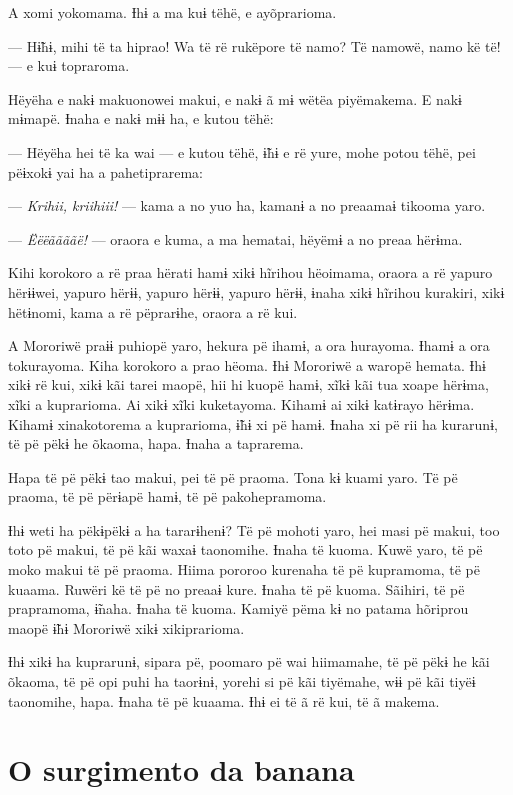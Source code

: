 A xomi yokomama. Ɨhɨ a ma kuɨ tëhë, e ayõprarioma. 

--- Hɨ̃hɨ, mihi të ta hiprao! Wa të rë rukëpore të namo? Të namowë, namo kë
të! --- e kuɨ topraroma. 

Hëyëha e nakɨ makuonowei makui, e nakɨ ã mɨ wëtëa piyëmakema. E nakɨ
mɨmapë. Ɨnaha e nakɨ mɨɨ ha, e kutou tëhë: 

--- Hëyëha hei të ka wai --- e kutou tëhë, ɨ̃hɨ e rë yure, mohe potou tëhë,
pei pëɨxokɨ yai ha a pahetiprarema:

--- \textit{Krihii, kriihiii!} --- kama a no yuo ha, kamanɨ a no preaamaɨ tikooma
yaro. 

--- \textit{Ëëëããããë!} --- oraora e kuma, a ma hematai, hëyëmɨ a no preaa hërɨma. 

Kihi korokoro a rë praa hërati hamɨ xikɨ hĩrihou hëoimama, oraora a rë
yapuro hërɨɨwei, yapuro hërɨɨ, yapuro hërɨɨ, yapuro hërɨɨ, ɨnaha xikɨ
hĩrihou kurakiri, xikɨ hëtɨnomi, kama a rë pëprarɨhe, oraora a rë kui. 

A Mororiwë praɨɨ puhiopë yaro, hekura pë ihamɨ, a ora hurayoma. Ɨhamɨ a
 ora tokurayoma. Kiha korokoro a prao hëoma. Ɨhɨ Mororiwë a waropë
 hemata. Ɨhɨ xikɨ rë kui, xikɨ kãi tarei maopë, hii hi kuopë hamɨ, xĩkɨ
 kãi tua xoape hërɨma, xĩki a kuprarioma. Ai xikɨ xĩki kuketayoma. Kihamɨ
 ai xikɨ katɨrayo hërɨma. Kihamɨ xinakotorema a kuprarioma, ɨ̃hɨ xi pë
 hamɨ. Ɨnaha xi pë rii ha kurarunɨ, të pë pëkɨ he õkaoma, hapa. Ɨnaha a
 taprarema. 

Hapa të pë pëkɨ tao makui, pei të pë praoma. Tona kɨ kuami yaro. Të pë
praoma, të pë përɨapë hamɨ, të pë pakohepramoma. 

Ɨhɨ weti ha pëkɨpëkɨ a ha tararɨhenɨ? Të pë mohoti yaro, hei masi pë
makui, too toto pë makui, të pë kãi waxaɨ taonomihe. Ɨnaha të kuoma.
Kuwë yaro, të pë moko makui të pë praoma. Hiima pororoo kurenaha të pë
kupramoma, të pë kuaama. Ruwëri kë të pë no preaaɨ kure. Ɨnaha të pë
kuoma. Sãihiri, të pë prapramoma, ɨ̃naha. Ɨnaha të kuoma. Kamiyë pëma kɨ
no patama hõriprou maopë ɨ̃hɨ Mororiwë xikɨ xikiprarioma. 

Ɨhɨ xikɨ ha kuprarunɨ, sipara pë, poomaro pë wai hiimamahe, të pë pëkɨ
he kãi õkaoma, të pë opi puhi ha taorɨnɨ, yorehi si pë kãi tiyëmahe, wɨɨ
pë kãi tiyëɨ taonomihe, hapa. Ɨnaha të pë kuaama. Ɨhɨ ei të ã rë kui, të
ã makema.

\chapter{O surgimento da banana}
 
